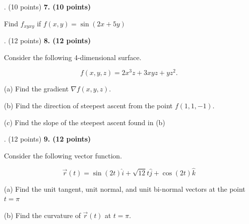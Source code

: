 \documentclass[12pt]{article}
\makeatletter
\newenvironment{problem}[1][]{%
  \bigskip%
  \noindent\begin{boxedminipage}{\columnwidth}%
  \def\@tempa{#1}%
  \ifx\@tempa\empty\else%
    \textbf{#1}\hspace{0.5em}%
  \fi%
}{%
  \end{boxedminipage}%
}
\makeatother
\begin{document}
\newpage
\begin{problem}[7. (10 points)]
Find $f_{xyxy}$ if $f(x,y) = \sin(2x+5y)$
\end{problem}


\newpage
\begin{problem}[8. (12 points)]
Consider the following 4-dimensional surface.

\begin{equation*}
    f(x,y,z) = 2x^3z+3xyz + yz^2.
\end{equation*}

(a) Find the gradient $\nabla f(x,y,z)$.

\vspace{.25cm}

(b) Find the direction of steepest ascent from the point $f(1,1,-1)$.

\vspace{.25cm}

(c) Find the slope of the steepest ascent found in (b)
\end{problem}

\newpage
\begin{problem}[9. (12 points)]
Consider the following vector function.

\begin{equation*}
    \vec{r}(t) = \sin(2t) \hat{i} + \sqrt{12}t\hat{j} +\cos(2t)\hat{k}
\end{equation*}

(a) Find the unit tangent, unit normal, and unit bi-normal vectors at the point $t = \pi$ 

\vspace{.25cm}

(b) Find the curvature of $\vec{r}(t)$ at $t=\pi$.


\end{problem}
\end{document}
